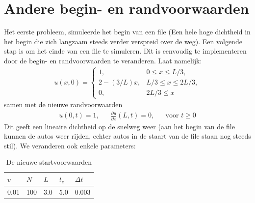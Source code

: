 \documentclass{article}
\newcommand{\Dt}{\Delta t}
\begin{document}
\section*{Andere begin- en randvoorwaarden}
Het eerste probleem, simuleerde het begin van een file (Een hele hoge dichtheid in het begin die zich langzaam steeds verder verspreid over de weg). 
Een volgende stap is om het einde van een file te simuleren. 
Dit is eenvoudig te implementeren door de begin- en randvoorwaarden te veranderen.
Laat namelijk:
\begin{align*}
	u(x,0) =\begin{cases}
	1, & 0\leq x \leq L/3,\\
	2-(3/L)x, & L/3 \leq x\leq 2L/3,\\
	0, & 2L/3 \leq x
	\end{cases}
\end{align*}
samen met de nieuwe randvoorwaarden 
\begin{align*}
u(0,t)=1,&&\frac{\partial u}{\partial x}(L,t)=0,&&\mbox{voor }t\geq 0
\end{align*}
Dit geeft een lineaire dichtheid op de snelweg weer (aan het begin van de file kunnen de autos weer rijden, echter autos in de staart van de file staan nog steeds stil).
We veranderen ook enkele parameters:
\begin{table}[H]
\centering
\label{tab:specs2}
\begin{tabular}{|l|l|l|l|l|}
\hline
\(v\) & \(N\) & \(L\) & \(t_e\) & \(\Dt\) \\ \hline
 0.01 & 100 & 3.0 & 5.0 & 0.003 \\ \hline
\end{tabular}
\caption{De nieuwe startvoorwaarden}
\end{table}
\end{document}
